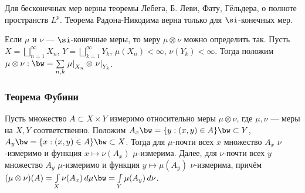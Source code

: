 \documentclass[10pt]{article}
\begin{document}
Для бесконечных мер верны теоремы Лебега, Б. Леви, Фату, Гёльдера, о
полноте пространств $L^p$. Теорема Радона-Никодима верна только для
$\si$-конечных мер.

Если $\mu$ и $\nu$ --- $\si$-конечные меры, то меру $\mu\otimes\nu$
можно определить так. Пусть $X=\bigsqcup\limits_{n=1}^\infty X_n$,
$Y=\bigsqcup\limits_{k=1}^\infty Y_k$, $\mu(X_n)<\infty$,
$\nu(Y_k)<\infty$. Тогда положим $\mu\otimes\nu:\bw
=\sum\limits_{n,k}\left.\mu\right|_{X_n}\otimes
\left.\nu\right|_{Y_k}$.

\subsubsection{Теорема Фубини}

\begin{theorem}\label{predecessor_Fubini}
Пусть множество $A\subset X\times Y$ измеримо относительно меры
$\mu\otimes\nu$, где $\mu,\nu$ --- меры на $X,Y$ соответственно.
Положим $A_x\bw =\{y: (x,y)\in A\}\bw\subset Y$, $A_y\bw =\{x:
(x,y)\in A\}\bw\subset X$. Тогда для $\mu$-почти всех $x$ множество
$A_x$ $\nu$-измеримо и функция $x\mapsto\nu(A_x)$ $\mu$-измерима.
Далее, для $\nu$-почти всех $y$ множество $A_y$ $\mu$-измеримо и
функция $y\mapsto\mu(A_y)$ $\nu$-измерима, причём
$(\mu\otimes\nu)(A)=\int\limits_X\nu(A_x)\,d\mu\bw
=\int\limits_Y\mu(A_y)\,d\nu$.
\end{theorem}
\end{document}

